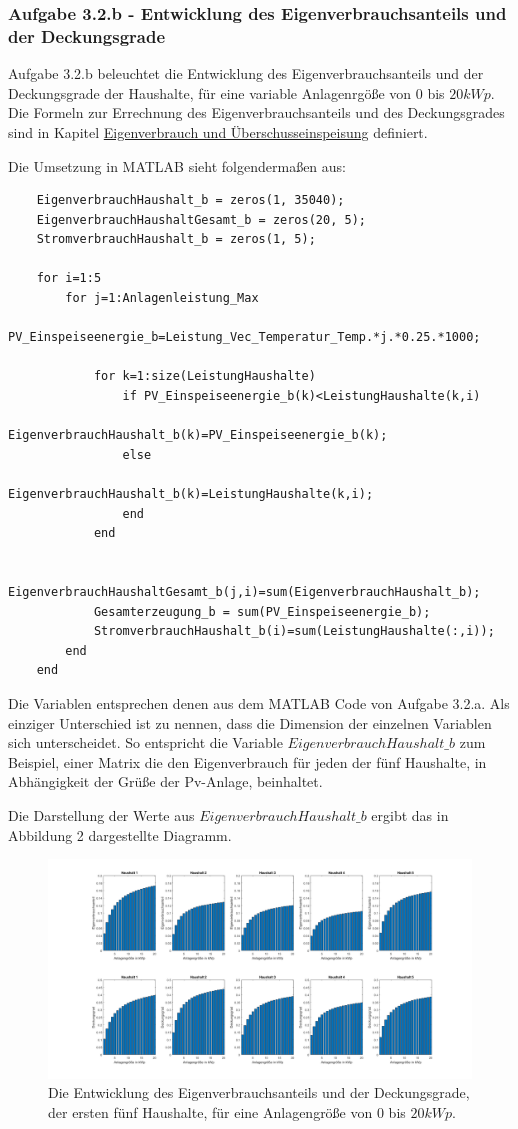 \documentclass[a4paper,12pt]{article}
\begin{document}
	\subsubsection{Aufgabe 3.2.b - Entwicklung des Eigenverbrauchsanteils und der Deckungsgrade}
	Aufgabe 3.2.b beleuchtet die Entwicklung des Eigenverbrauchsanteils und der Deckungsgrade der Haushalte, für eine variable Anlagenrgöße von $0$ bis $20kWp$.\newline
	Die Formeln zur Errechnung des Eigenverbrauchsanteils und des Deckungsgrades sind in Kapitel \hyperref[sec:eigenverbrauchueberschusseinspeisung]{Eigenverbrauch und Überschusseinspeisung} definiert.\\ \par
	Die Umsetzung in MATLAB sieht folgendermaßen aus:
	\begin{lstlisting}
	EigenverbrauchHaushalt_b = zeros(1, 35040);
	EigenverbrauchHaushaltGesamt_b = zeros(20, 5);
	StromverbrauchHaushalt_b = zeros(1, 5);
	
	for i=1:5
		for j=1:Anlagenleistung_Max
			PV_Einspeiseenergie_b=Leistung_Vec_Temperatur_Temp.*j.*0.25.*1000;
			
			for k=1:size(LeistungHaushalte)
				if PV_Einspeiseenergie_b(k)<LeistungHaushalte(k,i)
					EigenverbrauchHaushalt_b(k)=PV_Einspeiseenergie_b(k);
				else
					EigenverbrauchHaushalt_b(k)=LeistungHaushalte(k,i);
				end
			end
			
			EigenverbrauchHaushaltGesamt_b(j,i)=sum(EigenverbrauchHaushalt_b);
			Gesamterzeugung_b = sum(PV_Einspeiseenergie_b);
			StromverbrauchHaushalt_b(i)=sum(LeistungHaushalte(:,i));
		end
	end
	\end{lstlisting}
	Die Variablen entsprechen denen aus dem MATLAB Code von Aufgabe 3.2.a. Als einziger Unterschied ist zu nennen, dass die Dimension der einzelnen Variablen sich unterscheidet. So entspricht die Variable $EigenverbrauchHaushalt\_b$ zum Beispiel, einer Matrix die den Eigenverbrauch für jeden der fünf Haushalte, in Abhängigkeit der Grüße der Pv-Anlage, beinhaltet.\\ \par
	\noindent
	Die Darstellung der Werte aus $EigenverbrauchHaushalt\_b$ ergibt das in Abbildung 2 dargestellte Diagramm.
	\begin{figure}[H]
		\centering
		\includegraphics[width=12cm]{img/results/EigenverbrauchDeckungsanteil}
		\caption{Die Entwicklung des Eigenverbrauchsanteils und der Deckungsgrade, der ersten fünf Haushalte, für eine Anlagengröße von $0$ bis $20kWp$.}
	\end{figure}
\end{document}
